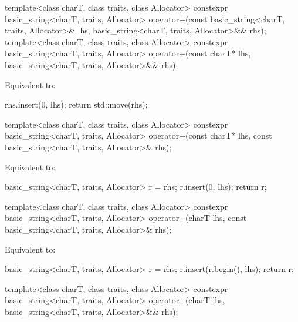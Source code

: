 %
\begin{itemdecl}
template<class charT, class traits, class Allocator>
  constexpr basic_string<charT, traits, Allocator>
    operator+(const basic_string<charT, traits, Allocator>& lhs,
              basic_string<charT, traits, Allocator>&& rhs);
template<class charT, class traits, class Allocator>
  constexpr basic_string<charT, traits, Allocator>
    operator+(const charT* lhs, basic_string<charT, traits, Allocator>&& rhs);
\end{itemdecl}

\begin{itemdescr}
\pnum
\effects
Equivalent to:
\begin{codeblock}
rhs.insert(0, lhs);
return std::move(rhs);
\end{codeblock}
\end{itemdescr}

%
\begin{itemdecl}
template<class charT, class traits, class Allocator>
  constexpr basic_string<charT, traits, Allocator>
    operator+(const charT* lhs, const basic_string<charT, traits, Allocator>& rhs);
\end{itemdecl}

\begin{itemdescr}
\pnum
\effects
Equivalent to:
\begin{codeblock}
basic_string<charT, traits, Allocator> r = rhs;
r.insert(0, lhs);
return r;
\end{codeblock}
\end{itemdescr}

%
\begin{itemdecl}
template<class charT, class traits, class Allocator>
  constexpr basic_string<charT, traits, Allocator>
    operator+(charT lhs, const basic_string<charT, traits, Allocator>& rhs);
\end{itemdecl}

\begin{itemdescr}
\pnum
\effects
Equivalent to:
\begin{codeblock}
basic_string<charT, traits, Allocator> r = rhs;
r.insert(r.begin(), lhs);
return r;
\end{codeblock}
\end{itemdescr}

%
\begin{itemdecl}
template<class charT, class traits, class Allocator>
  constexpr basic_string<charT, traits, Allocator>
    operator+(charT lhs, basic_string<charT, traits, Allocator>&& rhs);
\end{itemdecl}

